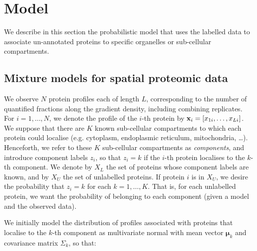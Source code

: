 \documentclass[10pt,letterpaper]{article}\usepackage[]{graphicx}\usepackage[]{color}
\begin{document}
{\color{black}{Currently, our model does not integrate localisation information
from different data sources, nor does it explicitly model proteins with multiple
localisation. However, one (of many) biological explanations for the uncertainty
that we model in the allocation probabilities is provided by multiple localisation.
Thus a protein for which it is uncertain to which two sub-cellular niches it is
resident within it is perhaps resident of both niches. In further work, we plan
to explicitly model such cases to deconvolute different sources of uncertainty.
In addition, extensions to semi-supervised non-parametric methods are under
consideration to detect novel sub-cellular niches. These are the subjects of further work.
}}


\bigskip

\section*{Model}\label{section:methods}

We describe in this section the probabilistic model that uses the
labelled data to associate un-annotated proteins to specific
organelles or sub-cellular compartments.

\subsection*{Mixture models for spatial proteomic data}

We observe $N$ protein profiles each of length $L$, corresponding to
the number of quantified fractions along the gradient density,
including combining replicates.  For $i = 1, \ldots, N$, we denote the
profile of the $i$-th protein by
${\bf x}_i = [x_{1i}, \ldots, x_{Li}]$.  We suppose that there are $K$
known sub-cellular compartments to which each protein could localise
(e.g. cytoplasm, endoplasmic reticulum, mitochondria, \ldots).
Henceforth, we refer to these $K$ sub-cellular compartments as {\em
  components}, and introduce component labels $z_i$, so that $z_i = k$
if the $i$-th protein localises to the $k$-th component. We denote by
$X_L$ the set of proteins whose component labels are known, and by
$X_U$ the set of unlabelled proteins.  If protein $i$ is in $X_U$, we
desire the probability that $z_i = k$ for each $k = 1, \ldots, K$.
That is, for each unlabelled protein, we want the probability of
belonging to each component (given a model and the observed data).


We initially model the distribution of profiles associated with
proteins that localise to the $k$-th component as multivariate normal
with mean vector $\boldsymbol{\mu}_k$ and covariance matrix
$\Sigma_k$, so that:
\end{document}
